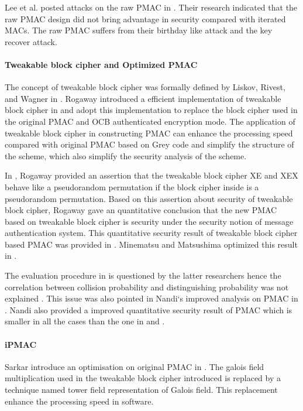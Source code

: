 \documentclass{article}
\begin{document}
Lee et al. posted attacks on the raw PMAC in \cite{pmac_forgery}. Their research indicated that the raw PMAC design did not bring advantage in security compared with iterated MACs. The raw PMAC suffers from their birthday like attack and the key recover attack.
 
\paragraph{Tweakable block cipher and Optimized PMAC}
The concept of tweakable block cipher was formally defined by Liskov, Rivest, and Wagner in \cite{tweak}. Rogaway introduced a efficient implementation of tweakable block cipher in \cite{tweak_pmac}and adopt this implementation to replace the block cipher used in the original PMAC and OCB authenticated encryption mode.
The application of tweakable block cipher in constructing PMAC can enhance the processing speed compared with original PMAC based on Grey code and simplify the structure of the scheme, which also simplify the security analysis of the scheme. 

In \cite{tweak_pmac}, Rogaway provided an assertion that the tweakable block cipher XE and XEX behave like a pseudorandom permutation if the block cipher inside is a pseudorandom permutation. Based on this assertion about security of tweakable block cipher, Rogaway gave an quantitative conclusion that the new PMAC based on tweakable block cipher is security under the security notion of message authentication system. This quantitative security result of tweakable block cipher based PMAC was provided in \cite{tweak_pmac}.
Minematsu and Matsushima optimized this result in \cite{new}. 

The evaluation procedure in \cite{pmac} is questioned by the latter researchers hence the correlation between collision probability and 
distinguishing probability was not explained . This issue was also pointed in Nandi`s improved analysis on PMAC in \cite{improve_pmac}. Nandi also provided a improved quantitative security result of PMAC which is smaller in all the cases than the one in \cite{pmac} and \cite{new}. 

\paragraph{iPMAC}
Sarkar introduce an optimisation on original PMAC in \cite{iPMAC}. The galois field multiplication used in the tweakable block cipher introduced is replaced by a technique named tower field representation of Galois field. This replacement enhance the processing speed in software.
\end{document}
